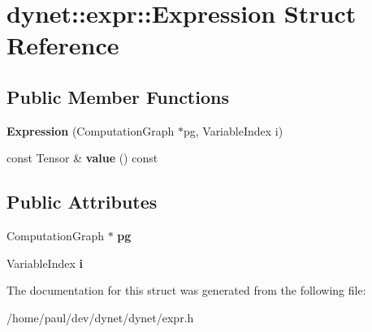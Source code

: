 \hypertarget{structdynet_1_1expr_1_1Expression}{}\section{dynet\+:\+:expr\+:\+:Expression Struct Reference}
\label{structdynet_1_1expr_1_1Expression}
\subsection*{Public Member Functions}
\begin{DoxyCompactItemize}
\item 
\hypertarget{structdynet_1_1expr_1_1Expression_a2bf2dd30fa0fdf2956090cd39f5b52dc}{}{\bfseries Expression} (Computation\+Graph $\ast$pg, Variable\+Index i)\label{structdynet_1_1expr_1_1Expression_a2bf2dd30fa0fdf2956090cd39f5b52dc}

\item 
\hypertarget{structdynet_1_1expr_1_1Expression_a34dfa51f88f52de548e219a458e81731}{}const Tensor \& {\bfseries value} () const \label{structdynet_1_1expr_1_1Expression_a34dfa51f88f52de548e219a458e81731}

\end{DoxyCompactItemize}
\subsection*{Public Attributes}
\begin{DoxyCompactItemize}
\item 
\hypertarget{structdynet_1_1expr_1_1Expression_a59221401f07f495340c5f6a5a29dadf5}{}Computation\+Graph $\ast$ {\bfseries pg}\label{structdynet_1_1expr_1_1Expression_a59221401f07f495340c5f6a5a29dadf5}

\item 
\hypertarget{structdynet_1_1expr_1_1Expression_a3d108e0edb73b2d38789a3a6a2dd5434}{}Variable\+Index {\bfseries i}\label{structdynet_1_1expr_1_1Expression_a3d108e0edb73b2d38789a3a6a2dd5434}

\end{DoxyCompactItemize}


The documentation for this struct was generated from the following file\+:\begin{DoxyCompactItemize}
\item 
/home/paul/dev/dynet/dynet/expr.\+h\end{DoxyCompactItemize}
